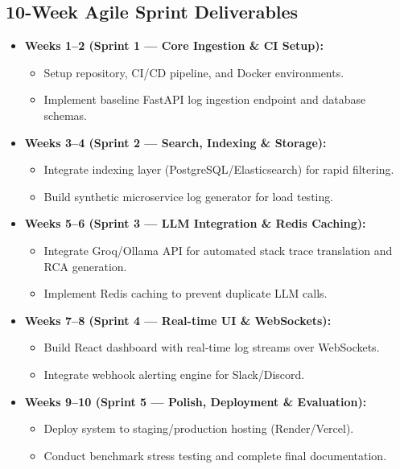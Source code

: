 \documentclass[11pt,a4paper]{article}
\begin{document}

\subsection{10-Week Agile Sprint Deliverables}

\begin{itemize}[leftmargin=0.7cm]

\item \textbf{Weeks 1--2 (Sprint 1 --- Core Ingestion \& CI Setup):}
\begin{itemize}
    \item Setup repository, CI/CD pipeline, and Docker environments.
    \item Implement baseline FastAPI log ingestion endpoint and database schemas.
\end{itemize}

\item \textbf{Weeks 3--4 (Sprint 2 --- Search, Indexing \& Storage):}
\begin{itemize}
    \item Integrate indexing layer (PostgreSQL/Elasticsearch) for rapid filtering.
    \item Build synthetic microservice log generator for load testing.
\end{itemize}

\item \textbf{Weeks 5--6 (Sprint 3 --- LLM Integration \& Redis Caching):}
\begin{itemize}
    \item Integrate Groq/Ollama API for automated stack trace translation and RCA generation.
    \item Implement Redis caching to prevent duplicate LLM calls.
\end{itemize}

\item \textbf{Weeks 7--8 (Sprint 4 --- Real-time UI \& WebSockets):}
\begin{itemize}
    \item Build React dashboard with real-time log streams over WebSockets.
    \item Integrate webhook alerting engine for Slack/Discord.
\end{itemize}

\item \textbf{Weeks 9--10 (Sprint 5 --- Polish, Deployment \& Evaluation):}
\begin{itemize}
    \item Deploy system to staging/production hosting (Render/Vercel).
    \item Conduct benchmark stress testing and complete final documentation.
\end{itemize}

\end{itemize}
\end{document}
